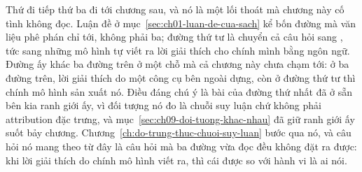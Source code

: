 %
%
Thứ đi tiếp thứ ba đi tới chương sau, và nó là một lối thoát mà chương này cố tình không
đọc. Luận đề ở mục~\ref{sec:ch01-luan-de-cua-sach} kể bốn đường mà văn liệu phê
phán chỉ tới, không phải ba; đường thứ tư là chuyển cả câu hỏi sang
, tức sang những mô hình tự viết ra lời
giải thích cho chính mình bằng ngôn ngữ. Đường ấy khác ba đường trên ở một chỗ
mà cả chương này chưa chạm tới: ở ba đường trên, lời giải thích do một công cụ
bên ngoài dựng, còn ở đường thứ tư thì chính mô hình sản xuất nó. Điều đáng chú
ý là bài của đường thứ nhất đã ở sẵn bên kia ranh giới ấy, vì đối tượng nó đo là
chuỗi suy luận chứ không phải attribution đặc trưng, và
mục~\ref{sec:ch09-doi-tuong-khac-nhau} đã giữ ranh giới ấy suốt bảy chương.
Chương~\ref{ch:do-trung-thuc-chuoi-suy-luan} bước qua nó, và câu hỏi nó mang
theo từ đây là câu hỏi mà ba đường vừa đọc đều không đặt ra được: khi lời giải
thích do chính mô hình viết ra, thì cái được so với hành vi là ai nói.
